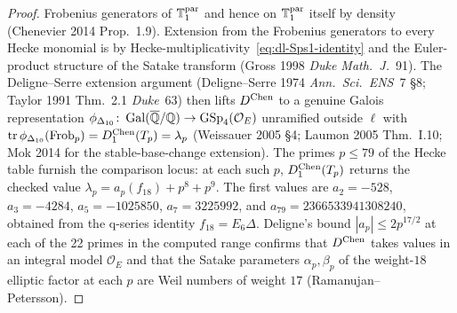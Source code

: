 \begin{proof}
Frobenius generators of $\mathbb{T}^{\mathrm{par}}_1$ and hence on $\mathbb{T}^{\mathrm{par}}_1$ itself by
density (Chenevier 2014 Prop.~1.9). Extension from the
Frobenius generators to every Hecke monomial is by
Hecke-multiplicativity~\eqref{eq:dl-Sps1-identity} and the
Euler-product structure of the Satake transform (Gross 1998 \emph{Duke
Math.\ J.}\ 91). The Deligne--Serre extension argument (Deligne--Serre
1974 \emph{Ann.\ Sci.\ ENS}\ 7 \S8; Taylor 1991 Thm.~2.1 \emph{Duke}\
63) then lifts $D^{\mathrm{Chen}}$ to a genuine Galois representation
$\phi_{\Delta_{10}}\colon\operatorname{Gal}(\overline{\mathbb{Q}}/\mathbb{Q})\to\operatorname{GSp}_4(\mathcal{O}_E)$
unramified outside $\ell$ with
$\operatorname{tr}\phi_{\Delta_{10}}(\mathrm{Frob}_p)=D^{\mathrm{Chen}}_1(T_p)=\lambda_p$
(Weissauer 2005 \S4; Laumon 2005 Thm.~I.10; Mok 2014 for the
stable-base-change extension). The primes $p\le 79$ of the
Hecke table furnish the comparison locus: at each such $p$,
$D^{\mathrm{Chen}}_1(T_p)$ returns the checked value
$\lambda_p=a_p(f_{18})+p^8+p^9$. The first values are
$a_2=-528$, $a_3=-4284$, $a_5=-1025850$, $a_7=3225992$, and
$a_{79}=2366533941308240$, obtained from the q-series identity
$f_{18}=E_6\Delta$. Deligne's bound
$|a_p|\le 2p^{17/2}$ at each of the 22 primes in the computed range
confirms that $D^{\mathrm{Chen}}$ takes values in an integral model
$\mathcal{O}_E$ and that the Satake parameters $\alpha_p,\beta_p$ of
the weight-$18$ elliptic factor at each $p$ are Weil numbers of weight
$17$ (Ramanujan--Petersson).
\end{proof}

